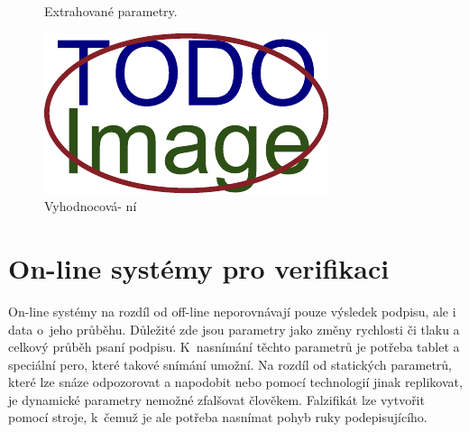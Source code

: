 \begin{figure}[h]
\begin{minipage}{0.3\textwidth}
    \caption{Extrahované parametry.}
    \label{fig:second-image}
  \end{minipage}\hfill
  \begin{minipage}{0.3\textwidth}
    \centering
    \includegraphics[width=\textwidth]{obrazky-figures/placeholder.pdf}
    \caption{Vyhodnocová- ní}
    \label{fig:third-image}
  \end{minipage}
\end{figure}


\section{On-line systémy pro verifikaci} 
On-line systémy na rozdíl od off-line neporovnávají pouze výsledek podpisu, ale i data o~jeho průběhu. %
Důležité zde jsou parametry jako změny rychlosti či tlaku a celkový průběh psaní podpisu.              %
K~nasnímání těchto parametrů je potřeba tablet a speciální pero, které takové snímání umožní.          %
Na rozdíl od statických parametrů, které lze snáze odpozorovat a napodobit                             %
nebo pomocí technologií jinak replikovat, je dynamické parametry nemožné zfalšovat člověkem.           %
Falzifikát lze vytvořit pomocí stroje, k~čemuž je ale potřeba nasnímat pohyb ruky podepisujícího.~\cite{VaccaJohnR2007}%

